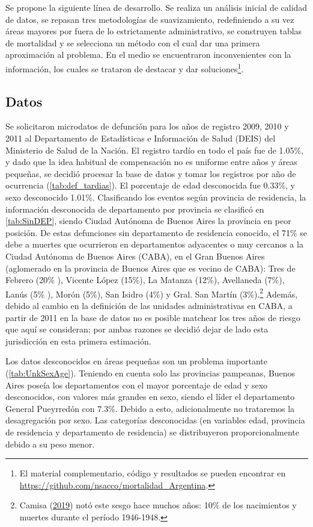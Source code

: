 \documentclass[12pt,]{article}
\begin{document}
Se propone la siguiente línea de desarrollo. Se realiza un análisis
inicial de calidad de datos, se repasan tres metodologías de
suavizamiento, redefiniendo a su vez áreas mayores por fuera de lo
estrictamente administrativo, se construyen tablas de mortalidad y se
selecciona un método con el cual dar una primera aproximación al
problema. En el medio se encuentraron inconvenientes con la información,
los cuales se trataron de destacar y dar soluciones\footnote{El material
  complementario, código y resultados se pueden encontrar en
  \url{https://github.com/nsacco/mortalidad_Argentina}.}.

\hypertarget{datos}{%
\subsection{\texorpdfstring{\textbf{Datos}}{Datos}}\label{datos}}

Se solicitaron microdatos de defunción para los años de registro 2009,
2010 y 2011 al Departamento de Estadísticas e Información de Salud
(DEIS) del Ministerio de Salud de la Nación. El registro tardío en todo
el país fue de 1.05\%, y dado que la idea habitual de compensación no es
uniforme entre años y áreas pequeñas, se decidió procesar la base de
datos y tomar los registros por año de ocurrencia
(\ref{tab:def_tardias}). El porcentaje de edad desconocida fue 0.33\%, y
sexo desconocido 1.01\%. Clasificando los eventos según provincia de
residencia, la información desconocida de departamento por provincia se
clasificó en \ref{tab:SinDEP}, siendo Ciudad Autónoma de Buenos Aires la
provincia en peor posición. De estas defunciones sin departamento de
residencia conocido, el 71\% se debe a muertes que ocurrieron en
departamentos adyacentes o muy cercanos a la Ciudad Autónoma de Buenos
Aires (CABA), en el Gran Buenos Aires (aglomerado en la provincia de
Buenos Aires que es vecino de CABA): Tres de Febrero (20\% ), Vicente
López (15\%), La Matanza (12\%), Avellaneda (7\%), Lanús (5\% ), Morón
(5\%), San Isidro (4\%) y Gral. San Martín (3\%).\footnote{Camisa
  (\protect\hyperlink{ref-Camisa_2019}{2019}) notó este sesgo hace
  muchos años: 10\% de los nacimientos y muertes durante el período
  1946-1948.} Además, debido al cambio en la definición de las unidades
administrativas en CABA, a partir de 2011 en la base de datos no es
posible matchear los tres años de riesgo que aquí se consideran; por
ambas razones se decidió dejar de lado esta jurisdicción en esta primera
estimación.

Los datos desconocidos en áreas pequeñas son un problema importante
(\ref{tab:UnkSexAge}). Teniendo en cuenta solo las provincias pampeanas,
Buenos Aires poseía los departamentos con el mayor porcentaje de edad y
sexo desconocidos, con valores más grandes en sexo, siendo el líder el
departamento General Pueyrredón con 7.3\%. Debido a esto, adicionalmente
no trataremos la desagregación por sexo. Las categorías desconocidas (en
variables edad, provincia de residencia y departamento de residencia) se
distribuyeron proporcionalmente debido a su peso menor.
\end{document}
